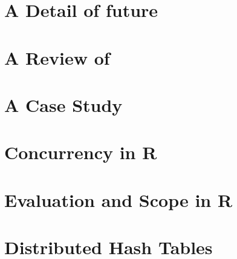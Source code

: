 \section{A Detail of future}\label{sec:future-detail}

\section{A Review of }\label{sec:review-foreach}

\section{A  Case Study}\label{sec:disk-frame-study}

\section{Concurrency in R}\label{sec:concurrency}

\section{Evaluation and Scope in R}\label{sec:eval}

\section{Distributed Hash Tables}\label{sec:dht}

